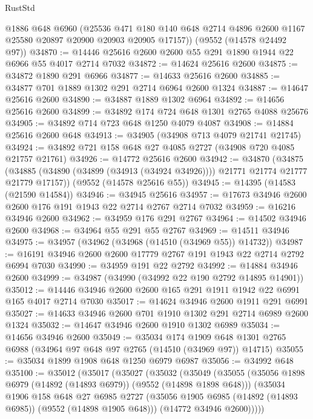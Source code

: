 \begin{lexlean}{RustStd}
\begin{coremodule}
      @1886
      @648
      @6960
      (@25536
        @471
        @180
        @140
        @648
        @2714
        @4896
        @2600
        @1167
        @25580
        @20897
        @20900
        @20903
        @20905
        @17157))
    (@9552 (@14578 @24492 @97))
@34870 := @14446 @25616 @2600 @2600 @55 @291 @1890 @1944 @22 @6966 @55 @4017 @2714 @7032
@34872 := @14624 @25616 @2600
@34875 := @34872 @1890 @291 @6966
@34877 := @14633 @25616 @2600
@34885 := @34877 @701 @1889 @1302 @291 @2714 @6964 @2600 @1324
@34887 := @14647 @25616 @2600
@34890 := @34887 @1889 @1302 @6964
@34892 := @14656 @25616 @2600
@34899 := @34892 @174 @724 @648 @1301 @2765 @4088 @25676
@34905 := @34892 @714 @723 @648 @1250 @4079 @4087
@34908 := @14884 @25616 @2600 @648
@34913 := @34905 (@34908 @713 @4079 @21741 @21745)
@34924 := @34892 @721 @158 @648 @27 @4085 @2727 (@34908 @720 @4085 @21757 @21761)
@34926 := @14772 @25616 @2600
@34942 := @34870
    (@34875 (@34885 (@34890 (@34899 (@34913 (@34924 @34926)))) @21771 @21774 @21777 @21779 @17157))
    (@9552 (@14578 @25616 @55))
@34945 := @14395 (@14583 (@21590 @14584))
@34946 := @34945 @25616
@34957 := @17673 @34946 @2600 @2600 @176 @191 @1943 @22 @2714 @2767 @2714 @7032
@34959 := @16216 @34946 @2600
@34962 := @34959 @176 @291 @2767
@34964 := @14502 @34946 @2600
@34968 := @34964 @55 @291 @55 @2767
@34969 := @14511 @34946
@34975 := @34957 (@34962 (@34968 (@14510 (@34969 @55)) @14732))
@34987 := @16191 @34946 @2600 @2600 @17779 @2767 @191 @1943 @22 @2714 @2792 @6994 @7030
@34990 := @34959 @191 @22 @2792
@34992 := @14884 @34946 @2600
@34999 := @34987 (@34990 (@34992 @22 @190 @2792 @14895 @14901))
@35012 := @14446 @34946 @2600 @2600 @165 @291 @1911 @1942 @22 @6991 @165 @4017 @2714 @7030
@35017 := @14624 @34946 @2600 @1911 @291 @6991
@35027 := @14633 @34946 @2600 @701 @1910 @1302 @291 @2714 @6989 @2600 @1324
@35032 := @14647 @34946 @2600 @1910 @1302 @6989
@35034 := @14656 @34946 @2600
@35049 := @35034
    @174
    @1909
    @648
    @1301
    @2765
    @6988
    (@34964 @97 @648 @97 @2765 (@14510 (@34969 @97)) @14715)
@35055 := @35034 @1899 @1908 @648 @1250 @6979 @6987
@35056 := @34992 @648
@35100 := @35012
    (@35017
      (@35027
        (@35032
          (@35049
            (@35055
              (@35056 @1898 @6979 (@14892 (@14893 @6979)) (@9552 (@14898 @1898 @648)))
              (@35034
                @1906
                @158
                @648
                @27
                @6985
                @2727
                (@35056 @1905 @6985 (@14892 (@14893 @6985)) (@9552 (@14898 @1905 @648)))
                (@14772 @34946 @2600)))))

\end{coremodule}
\end{lexlean}
